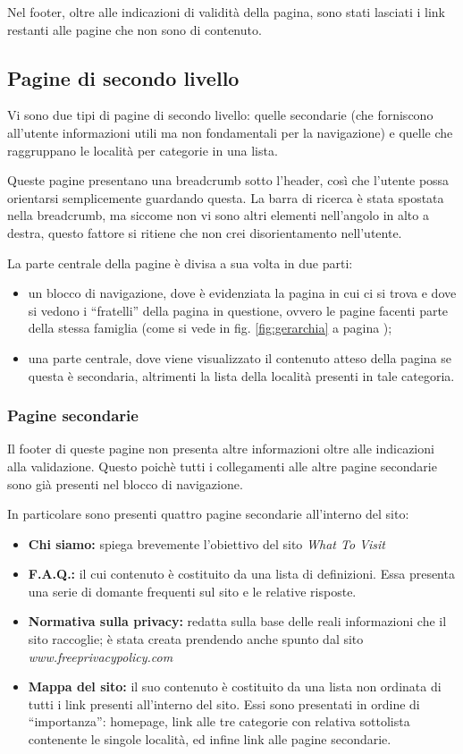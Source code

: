 Nel footer, oltre alle indicazioni di validità della pagina, sono stati lasciati i link restanti alle pagine che non sono di contenuto.

\subsection{Pagine di secondo livello}\label{sec:IIlev}
Vi sono due tipi di pagine di secondo livello: quelle secondarie (che forniscono all'utente informazioni utili ma non fondamentali per la navigazione) e quelle che raggruppano le località per categorie in una lista.

Queste pagine presentano una breadcrumb sotto l'header, così che l'utente possa orientarsi semplicemente guardando questa. La barra di ricerca è stata spostata nella breadcrumb, ma siccome non vi sono altri elementi nell'angolo in alto a destra, questo fattore si ritiene che non crei disorientamento nell'utente.

La parte centrale della pagine è divisa a sua volta in due parti:
\begin{itemize}
\item un blocco di navigazione, dove è evidenziata la pagina in cui ci si trova e dove si vedono i ``fratelli'' della pagina in questione, ovvero le pagine facenti parte della stessa famiglia (come si vede in fig. \ref{fig:gerarchia} a pagina \pageref{fig:gerarchia});
\item una parte centrale, dove viene visualizzato il contenuto atteso della pagina se questa è secondaria, altrimenti la lista della località presenti in tale categoria.
\end{itemize}

\subsubsection{Pagine secondarie}
Il footer di queste pagine non presenta altre informazioni oltre alle indicazioni alla validazione. Questo poichè tutti i collegamenti alle altre pagine secondarie sono già presenti nel blocco di navigazione.

In particolare sono presenti quattro pagine secondarie all'interno del sito:
\begin{itemize}
\item \textbf{Chi siamo:} spiega brevemente l'obiettivo del sito \textit{What To Visit} 
\item \textbf{F.A.Q.:} il cui contenuto è costituito da una lista di definizioni. Essa presenta una serie di domante frequenti sul sito e le relative risposte.
\item \textbf{Normativa sulla privacy:} redatta sulla base delle reali informazioni che il sito raccoglie; è stata creata prendendo anche spunto dal sito \textit{www.freeprivacypolicy.com}
\item \textbf{Mappa del sito:} il suo contenuto è costituito da una lista non ordinata di tutti i link presenti all'interno del sito. Essi sono presentati in ordine di ``importanza'': homepage, link alle tre categorie con relativa sottolista contenente le singole località, ed infine link alle pagine secondarie.
\end{itemize}

